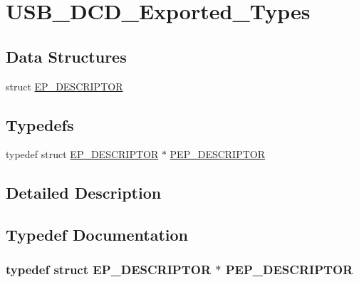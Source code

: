 \hypertarget{group___u_s_b___d_c_d___exported___types}{\section{U\-S\-B\-\_\-\-D\-C\-D\-\_\-\-Exported\-\_\-\-Types}
\label{group___u_s_b___d_c_d___exported___types}
}
\subsection*{Data Structures}
\begin{DoxyCompactItemize}
\item 
struct \hyperlink{struct_e_p___d_e_s_c_r_i_p_t_o_r}{E\-P\-\_\-\-D\-E\-S\-C\-R\-I\-P\-T\-O\-R}
\end{DoxyCompactItemize}
\subsection*{Typedefs}
\begin{DoxyCompactItemize}
\item 
typedef struct \hyperlink{struct_e_p___d_e_s_c_r_i_p_t_o_r}{E\-P\-\_\-\-D\-E\-S\-C\-R\-I\-P\-T\-O\-R} $\ast$ \hyperlink{group___u_s_b___d_c_d___exported___types_ga03f13b95bf6b7ae69e3591db55a69ed6}{P\-E\-P\-\_\-\-D\-E\-S\-C\-R\-I\-P\-T\-O\-R}
\end{DoxyCompactItemize}


\subsection{Detailed Description}


\subsection{Typedef Documentation}
\hypertarget{group___u_s_b___d_c_d___exported___types_ga03f13b95bf6b7ae69e3591db55a69ed6}{
\subsubsection[{P\-E\-P\-\_\-\-D\-E\-S\-C\-R\-I\-P\-T\-O\-R}]{\setlength{\rightskip}{0pt plus 5cm}typedef  struct {\bf E\-P\-\_\-\-D\-E\-S\-C\-R\-I\-P\-T\-O\-R} $\ast$ {\bf P\-E\-P\-\_\-\-D\-E\-S\-C\-R\-I\-P\-T\-O\-R}}}\label{group___u_s_b___d_c_d___exported___types_ga03f13b95bf6b7ae69e3591db55a69ed6}
